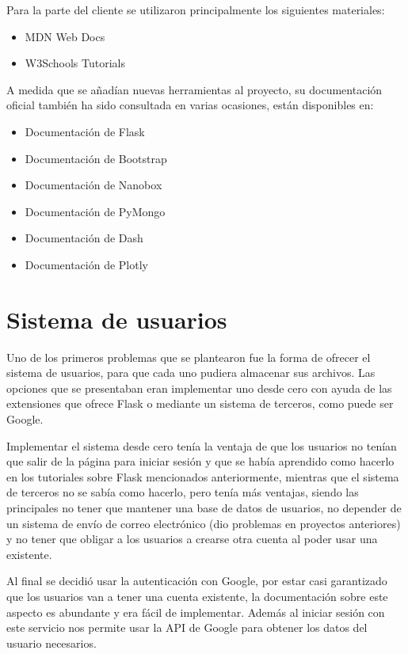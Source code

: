 \noindent Para la parte del cliente se utilizaron principalmente los siguientes
materiales:
\begin{itemize}
	\item MDN Web Docs~\cite{mdn}
	\item W3Schools Tutorials~\cite{w3schools}
\end{itemize}

A medida que se añadían nuevas herramientas al proyecto, su documentación
oficial también ha sido consultada en varias ocasiones, están disponibles en:
\begin{itemize}
	\item Documentación de Flask~\cite{doc:flask}
	\item Documentación de Bootstrap~\cite{doc:bootstrap}
	\item Documentación de Nanobox~\cite{doc:nanobox}
	\item Documentación de PyMongo~\cite{doc:pymongo}
	\item Documentación de Dash~\cite{doc:dash}
	\item Documentación de Plotly~\cite{doc:plotly}
\end{itemize}

\section{Sistema de usuarios}

Uno de los primeros problemas que se plantearon fue la forma de ofrecer el
sistema de usuarios, para que cada uno pudiera almacenar sus archivos. Las
opciones que se presentaban eran implementar uno desde cero con ayuda de las
extensiones que ofrece Flask o mediante un sistema de terceros, como puede ser
Google.

Implementar el sistema desde cero tenía la ventaja de que los usuarios no tenían
que salir de la página para iniciar sesión y que se había aprendido como hacerlo
en los tutoriales sobre Flask mencionados anteriormente, mientras que el sistema
de terceros no se sabía como hacerlo, pero tenía más ventajas, siendo las
principales no tener que mantener una base de datos de usuarios, no depender de
un sistema de envío de correo electrónico (dio problemas en proyectos
anteriores) y no tener que obligar a los usuarios a crearse otra cuenta al poder
usar una existente.

Al final se decidió usar la autenticación con Google, por estar casi garantizado
que los usuarios van a tener una cuenta existente, la documentación sobre este
aspecto es abundante y era fácil de implementar. Además al iniciar sesión con
este servicio nos permite usar la API de Google para obtener los datos del
usuario necesarios.


